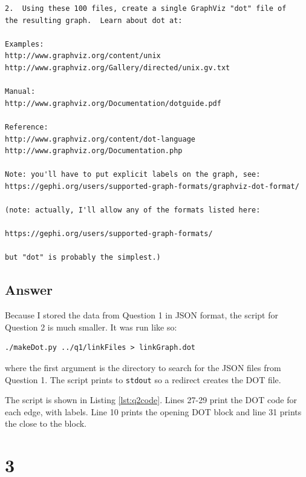 \documentclass[letterpaper,11pt]{article}
\begin{document}
\begin{verbatim}
2.  Using these 100 files, create a single GraphViz "dot" file of
the resulting graph.  Learn about dot at:

Examples:
http://www.graphviz.org/content/unix
http://www.graphviz.org/Gallery/directed/unix.gv.txt

Manual:
http://www.graphviz.org/Documentation/dotguide.pdf

Reference:
http://www.graphviz.org/content/dot-language
http://www.graphviz.org/Documentation.php

Note: you'll have to put explicit labels on the graph, see:
https://gephi.org/users/supported-graph-formats/graphviz-dot-format/

(note: actually, I'll allow any of the formats listed here:

https://gephi.org/users/supported-graph-formats/

but "dot" is probably the simplest.)
\end{verbatim}

\newpage
\subsection*{Answer}

Because I stored the data from Question 1 in JSON format, the script for Question 2 is much smaller.  It was run like so:

\begin{lstlisting}[frame=single]
./makeDot.py ../q1/linkFiles > linkGraph.dot
\end{lstlisting}
where the first argument is the directory to search for the JSON files from Question 1.  The script prints to \verb+stdout+ so a redirect creates the DOT file.

The script is shown in Listing \ref{lst:q2code}.  Lines 27-29 print the DOT code for each edge, with labels.  Line 10 prints the opening DOT block and line 31 prints the close to the block.




\newpage
\section*{3}
\end{document}
